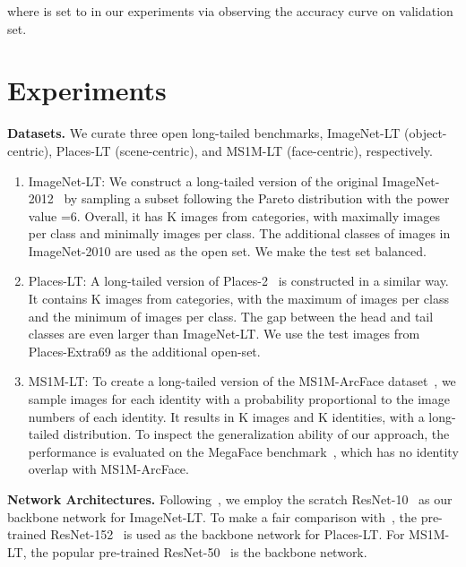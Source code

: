\documentclass[10pt,twocolumn,letterpaper]{article}
\begin{document}
where  is set to  in our experiments 
via observing the accuracy curve on validation set.






 
\section{Experiments}

\noindent
\textbf{Datasets.}
We curate three open long-tailed benchmarks, ImageNet-LT (object-centric), Places-LT (scene-centric), and MS1M-LT (face-centric), respectively.
\begin{enumerate}[leftmargin=*]
\item ImageNet-LT: We construct a long-tailed version of the original ImageNet-2012~\cite{deng2009imagenet} by sampling a subset  following the Pareto distribution with the power value =6. Overall, it has K images from  categories, with  maximally  images per class and minimally  images per class. 
The additional classes of images in ImageNet-2010 are used as the open set.
We make the test set balanced.
\item Places-LT: A long-tailed version of Places-2~\cite{zhou2018places} is constructed in a similar way. It contains K images from  categories, with the maximum of  images per class and the minimum of  images per class. 
The gap between the head and tail classes are even larger than ImageNet-LT. We use the test images from Places-Extra69 as the additional open-set.
\item MS1M-LT: 
To create a long-tailed version of the MS1M-ArcFace dataset~\cite{guo2016ms, deng2018arcface}, we sample images for each identity with a probability proportional to the image numbers of each identity. It results in K images and K identities, with a long-tailed distribution.
To inspect the generalization ability of our approach, the performance is evaluated on the MegaFace benchmark~\cite{kemelmacher2016megaface}, which has no identity overlap with MS1M-ArcFace.
\end{enumerate}

\noindent
\textbf{Network Architectures.}
Following~\cite{hariharan2017low, wang2018low, gidaris2018dynamic}, we employ the scratch ResNet-10~\cite{he2016deep} as our backbone network for ImageNet-LT.
To make a fair comparison with~\cite{wang2017learning}, the pre-trained ResNet-152~\cite{he2016deep} is used as the backbone network for Places-LT.
For MS1M-LT, the popular pre-trained ResNet-50~\cite{he2016deep} is the backbone network.
\end{document}
